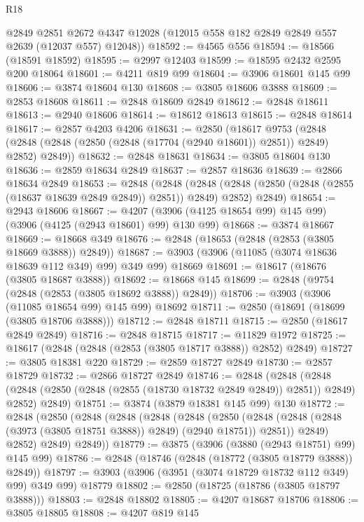 \begin{lexlean}{R18}
\begin{coremodule}
      @2849
      @2851
      @2672
      @4347
      @12028
      (@12015 @558 @182 @2849 @2849 @557 @2639 (@12037 @557) @12048))
@18592 := @4565 @556
@18594 := @18566 (@18591 @18592)
@18595 := @2997 @12403
@18599 := @18595 @2432 @2595 @200 @18064
@18601 := @4211 @819 @99
@18604 := @3906 @18601 @145 @99
@18606 := @3874 @18604 @130
@18608 := @3805 @18606 @3888
@18609 := @2853 @18608
@18611 := @2848 @18609 @2849
@18612 := @2848 @18611
@18613 := @2940 @18606
@18614 := @18612 @18613
@18615 := @2848 @18614
@18617 := @2857 @4203 @4206
@18631 := @2850
    (@18617
      @9753
      (@2848 (@2848 (@2848 (@2850 (@2848 (@17704 (@2940 @18601)) @2851)) @2849) @2852) @2849))
@18632 := @2848 @18631
@18634 := @3805 @18604 @130
@18636 := @2859 @18634 @2849
@18637 := @2857 @18636
@18639 := @2866 @18634 @2849
@18653 := @2848
    (@2848
      (@2848 (@2848 (@2850 (@2848 (@2855 (@18637 @18639 @2849 @2849)) @2851)) @2849) @2852)
      @2849)
@18654 := @2943 @18606
@18667 := @4207 (@3906 (@4125 @18654 @99) @145 @99) (@3906 (@4125 (@2943 @18601) @99) @130 @99)
@18668 := @3874 @18667
@18669 := @18668 @349
@18676 := @2848 (@18653 (@2848 (@2853 (@3805 @18669 @3888)) @2849))
@18687 := @3903 (@3906 (@11085 (@3074 @18636 @18639 @112 @349) @99) @349 @99) @18669
@18691 := @18617 (@18676 (@3805 @18687 @3888))
@18692 := @18668 @145
@18699 := @2848 (@9754 (@2848 (@2853 (@3805 @18692 @3888)) @2849))
@18706 := @3903 (@3906 (@11085 @18654 @99) @145 @99) @18692
@18711 := @2850 (@18691 (@18699 (@3805 @18706 @3888)))
@18712 := @2848 @18711
@18715 := @2850 (@18617 @2849 @2849)
@18716 := @2848 @18715
@18717 := @11829 @1972
@18725 := @18617 (@2848 (@2848 (@2853 (@3805 @18717 @3888)) @2852) @2849)
@18727 := @3805 @18381 @220
@18729 := @2859 @18727 @2849
@18730 := @2857 @18729
@18732 := @2866 @18727 @2849
@18746 := @2848
    (@2848
      (@2848 (@2848 (@2850 (@2848 (@2855 (@18730 @18732 @2849 @2849)) @2851)) @2849) @2852)
      @2849)
@18751 := @3874 (@3879 @18381 @145 @99) @130
@18772 := @2848
    (@2850
      (@2848
        (@2848
          (@2848
            (@2848
              (@2850
                (@2848 (@2848 (@2848 (@3973 (@3805 @18751 @3888)) @2849) (@2940 @18751)) @2851))
              @2849)
            @2852)
          @2849)
        @2849))
@18779 := @3875 (@3906 (@3880 (@2943 @18751) @99) @145 @99)
@18786 := @2848 (@18746 (@2848 (@18772 (@3805 @18779 @3888)) @2849))
@18797 := @3903 (@3906 (@3951 (@3074 @18729 @18732 @112 @349) @99) @349 @99) @18779
@18802 := @2850 (@18725 (@18786 (@3805 @18797 @3888)))
@18803 := @2848 @18802
@18805 := @4207 @18687 @18706
@18806 := @3805 @18805
@18808 := @4207 @819 @145

\end{coremodule}
\end{lexlean}

